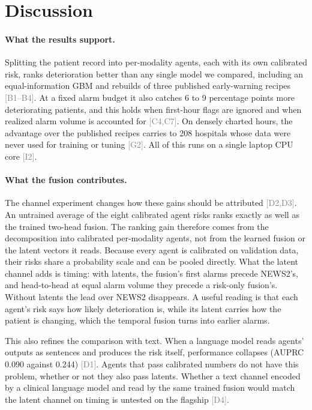 \documentclass[11pt]{article}
\newcommand{\ev}[1]{\textcolor{gray}{\scriptsize[#1]}}   %
\begin{document}
\section{Discussion}\label{sec:discussion}

\paragraph{What the results support.}
Splitting the patient record into per-modality agents, each with its own
calibrated risk, ranks deterioration better than any single model we compared,
including an equal-information GBM and rebuilds of three published early-warning
recipes \ev{B1--B4}. At a fixed alarm budget it also catches 6 to 9 percentage
points more deteriorating patients, and this holds when first-hour flags are
ignored and when realized alarm volume is accounted for \ev{C4,C7}. On densely charted
hours, the advantage over the published recipes carries to 208 hospitals whose
data were never used for training or tuning \ev{G2}. All of this runs on a single laptop CPU core
\ev{I2}.

\paragraph{What the fusion contributes.}
The channel experiment changes how these gains should be attributed
\ev{D2,D3}. An untrained average of the eight calibrated agent risks ranks
exactly as well as the trained two-head fusion. The ranking gain therefore comes
from the decomposition into calibrated per-modality agents, not from the learned
fusion or the latent vectors it reads. Because every agent is calibrated on
validation data, their risks share a probability scale and can be pooled
directly. What the latent channel adds is timing: with latents, the fusion's
first alarms precede NEWS2's, and head-to-head at equal alarm volume they precede
a risk-only fusion's. Without latents the lead over NEWS2 disappears. A useful
reading is that each agent's risk says how likely deterioration is, while its
latent carries how the patient is changing, which the temporal fusion turns into
earlier alarms.

This also refines the comparison with text. When a language model reads agents'
outputs as sentences and produces the risk itself, performance collapses (AUPRC
0.090 against 0.244) \ev{D1}. Agents that pass calibrated numbers do not have
this problem, whether or not they also pass latents. Whether a text channel
encoded by a clinical language model and read by the same trained fusion would
match the latent channel on timing is untested on the flagship \ev{D4}.
\end{document}
